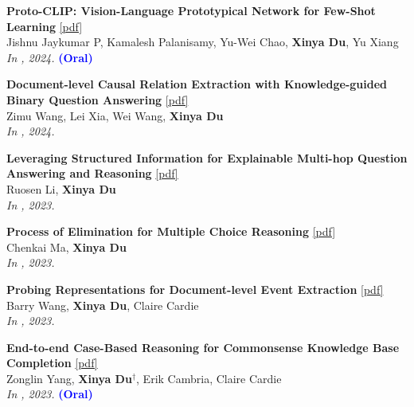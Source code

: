 \begin{enumerate}[{[}1{]},leftmargin=*]
\item 
{\bf Proto-CLIP: Vision-Language Prototypical Network for Few-Shot Learning} 
\href{https://arxiv.org/pdf/2307.03073}{{[pdf]}} \\
Jishnu Jaykumar P, Kamalesh Palanisamy, Yu-Wei Chao, \textbf{Xinya Du}, Yu Xiang \\
{\it In \IROS, 2024.} {\textcolor{blue}{\textbf{(Oral)}}} \\

\parbox{\textwidth}{
\item 
{\bf Document-level Causal Relation Extraction with Knowledge-guided Binary Question Answering} 
\href{https://arxiv.org/pdf/2410.04752}{{[pdf]}} \\
Zimu Wang, Lei Xia, Wei Wang, \textbf{Xinya Du}  \\
{\it In \EMNLPfinding, 2024.} \\
}

\item 
{\bf Leveraging Structured Information for Explainable Multi-hop Question Answering and Reasoning} 
\href{https://aclanthology.org/2023.findings-emnlp.452.pdf}{{[pdf]}} \\
Ruosen Li, \textbf{Xinya Du} \\
{\it In \EMNLPfinding, 2023.} \\

\parbox{\textwidth}{
\item 
{\bf Process of Elimination for Multiple Choice Reasoning} 
\href{https://aclanthology.org/2023.emnlp-main.273.pdf}{{[pdf]}} \\
Chenkai Ma, \textbf{Xinya Du} \\
{\it In \EMNLP, 2023.} \\
}

\item 
{\bf Probing Representations for Document-level Event Extraction} 
\href{https://aclanthology.org/2023.findings-emnlp.844.pdf}{{[pdf]}} \\
Barry Wang, \textbf{Xinya Du}, Claire Cardie \\
{\it In \EMNLPfinding, 2023.} \\

\item 
{\bf End-to-end Case-Based Reasoning for Commonsense Knowledge Base Completion} 
\href{https://aclanthology.org/2023.eacl-main.255.pdf}{{[pdf]}} \\
Zonglin Yang, \textbf{Xinya Du}$^{\dagger}$, Erik Cambria, Claire Cardie \\
{\it In \EACL, 2023.} {\textcolor{blue}{\textbf{(Oral)}}} \\ 


\end{enumerate}

